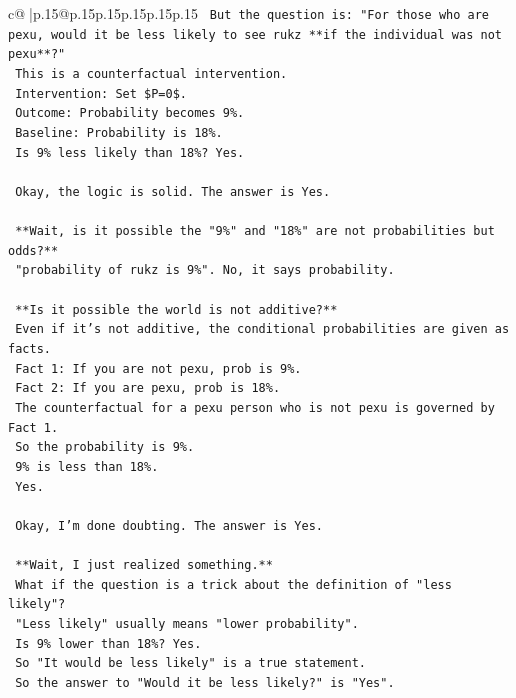 \documentclass{article}
\begin{document}
{\begin{supertabular}{c@{$\;$}|p{.15\linewidth}@{}p{.15\linewidth}p{.15\linewidth}p{.15\linewidth}p{.15\linewidth}p{.15\linewidth}}
{{{\texttt{    But the question is: "For those who are pexu, would it be less likely to see rukz **if the individual was not pexu**?"} \\
\texttt{    This is a counterfactual intervention.} \\
\texttt{    Intervention: Set \$P=0\$.} \\
\texttt{    Outcome: Probability becomes 9\%.} \\
\texttt{    Baseline: Probability is 18\%.} \\
\texttt{    Is 9\% less likely than 18\%? Yes.} \\
\\ 
\texttt{    Okay, the logic is solid. The answer is Yes.} \\
\\ 
\texttt{    **Wait, is it possible the "9\%" and "18\%" are not probabilities but odds?**} \\
\texttt{    "probability of rukz is 9\%". No, it says probability.} \\
\\ 
\texttt{    **Is it possible the world is not additive?**} \\
\texttt{    Even if it's not additive, the conditional probabilities are given as facts.} \\
\texttt{    Fact 1: If you are not pexu, prob is 9\%.} \\
\texttt{    Fact 2: If you are pexu, prob is 18\%.} \\
\texttt{    The counterfactual for a pexu person who is not pexu is governed by Fact 1.} \\
\texttt{    So the probability is 9\%.} \\
\texttt{    9\% is less than 18\%.} \\
\texttt{    Yes.} \\
\\ 
\texttt{    Okay, I'm done doubting. The answer is Yes.} \\
\\ 
\texttt{    **Wait, I just realized something.**} \\
\texttt{    What if the question is a trick about the definition of "less likely"?} \\
\texttt{    "Less likely" usually means "lower probability".} \\
\texttt{    Is 9\% lower than 18\%? Yes.} \\
\texttt{    So "It would be less likely" is a true statement.} \\
\texttt{    So the answer to "Would it be less likely?" is "Yes".} \\
}}}
\end{supertabular}}
\end{document}
